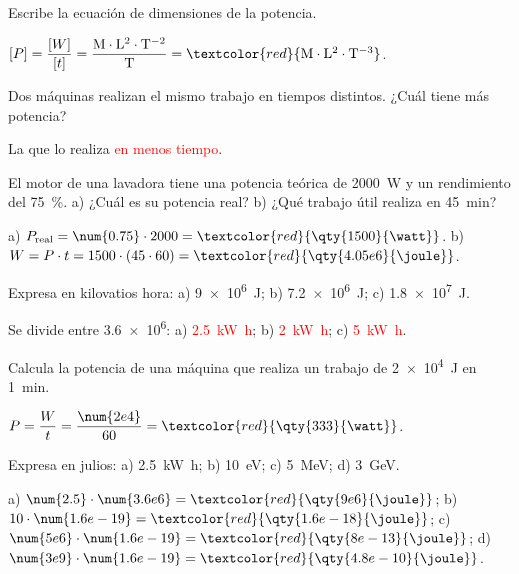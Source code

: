 \begin{exercise}
    Escribe la ecuación de dimensiones de la potencia.
    \begin{solu}
        \([P] = \dfrac{[W]}{[t]} = \dfrac{\mathrm{M \cdot L^2 \cdot T^{-2}}}{\mathrm{T}} = \textcolor{red}{\mathrm{M \cdot L^2 \cdot T^{-3}}}\).
    \end{solu}
\end{exercise}

\begin{exercise}
    Dos máquinas realizan el mismo trabajo en tiempos distintos. ¿Cuál tiene más potencia?
    \begin{solu}
        La que lo realiza \textcolor{red}{en menos tiempo}.
    \end{solu}
\end{exercise}

\begin{exercise}
    El motor de una lavadora tiene una potencia teórica de \qty{2000}{\watt} y un rendimiento del \qty{75}{\percent}. a) ¿Cuál es su potencia real? b) ¿Qué trabajo útil realiza en \qty{45}{\minute}?
    \begin{solu}
        a) \(P_{\text{real}} = \num{0.75} \cdot 2000 = \textcolor{red}{\qty{1500}{\watt}}\). b) \(W = P \cdot t = 1500 \cdot (45 \cdot 60) = \textcolor{red}{\qty{4.05e6}{\joule}}\).
    \end{solu}
\end{exercise}

\begin{exercise}
    Expresa en kilovatios hora: a) \qty{9e6}{\joule}; b) \qty{7.2e6}{\joule}; c) \qty{1.8e7}{\joule}.
    \begin{solu}
        Se divide entre \num{3.6e6}: a) \textcolor{red}{\qty{2.5}{\kilo\watt\hour}}; b) \textcolor{red}{\qty{2}{\kilo\watt\hour}}; c) \textcolor{red}{\qty{5}{\kilo\watt\hour}}.
    \end{solu}
\end{exercise}

\begin{exercise}
    Calcula la potencia de una máquina que realiza un trabajo de \qty{2e4}{\joule} en \qty{1}{\minute}.
    \begin{solu}
        \(P = \dfrac{W}{t} = \dfrac{\num{2e4}}{60} = \textcolor{red}{\qty{333}{\watt}}\).
    \end{solu}
\end{exercise}

\begin{exercise}
    Expresa en julios: a) \qty{2.5}{\kilo\watt\hour}; b) \qty{10}{\electronvolt}; c) \qty{5}{\mega\electronvolt}; d) \qty{3}{\giga\electronvolt}.
    \begin{solu}
        a) \(\num{2.5} \cdot \num{3.6e6} = \textcolor{red}{\qty{9e6}{\joule}}\); b) \(10 \cdot \num{1.6e-19} = \textcolor{red}{\qty{1.6e-18}{\joule}}\); c) \(\num{5e6} \cdot \num{1.6e-19} = \textcolor{red}{\qty{8e-13}{\joule}}\); d) \(\num{3e9} \cdot \num{1.6e-19} = \textcolor{red}{\qty{4.8e-10}{\joule}}\).
    \end{solu}
\end{exercise}

